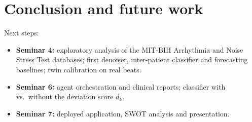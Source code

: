 \chapter{Conclusion and future work}
\label{chapter:concl}

Next steps:
\begin{itemize}
	\item \textbf{Seminar 4:} exploratory analysis of the MIT-BIH Arrhythmia and Noise Stress Test databases; first denoiser, inter-patient classifier and forecasting baselines; twin calibration on real beats.
	\item \textbf{Seminar 6:} agent orchestration and clinical reports; classifier with vs.\ without the deviation score $d_k$.
	\item \textbf{Seminar 7:} deployed application, SWOT analysis and presentation.
\end{itemize}
